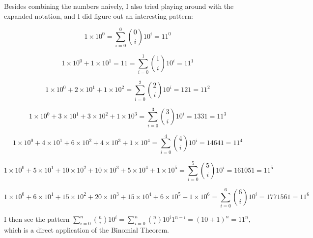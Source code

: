 \documentclass[10pt]{article}
\begin{document}
\begin{enumerate}
Besides combining the numbers naively, I also tried playing around with the expanded notation, and I did figure out an interesting pattern:

$$1 \times  10^0 = \sum\limits_{i=0}^{0}\binom{0}{i}10^i= 11^0$$

$$1 \times  10^0 + 1 \times 10^1 = 11 = \sum\limits_{i=0}^{1}\binom{1}{i}10^i = 11^1$$

$$1 \times  10^0 + 2 \times 10^1 + 1 \times 10^2 = \sum\limits_{i=0}^{2}\binom{2}{i}10^i = 121 = 11^2$$

$$1 \times  10^0 + 3 \times 10^1 + 3 \times 10^2 + 1 \times 10^3 = \sum\limits_{i=0}^{3}\binom{3}{i}10^i = 1331 = 11^3$$

$$1 \times  10^0 + 4 \times 10^1 + 6 \times 10^2 + 4 \times 10^3 + 1 \times 10^4= \sum\limits_{i=0}^{4}\binom{4}{i}10^i = 14641 = 11^4$$

$$1 \times  10^0 + 5 \times 10^1 + 10 \times 10^2 + 10 \times 10^3 + 5 \times 10^4 + 1 \times 10^5= \sum\limits_{i=0}^{5}\binom{5}{i}10^i = 161051 = 11^5$$

$$1 \times  10^0 + 6 \times 10^1 + 15 \times 10^2 + 20 \times 10^3 + 15 \times 10^4 + 6 \times 10^5 + 1 \times 10^6= \sum\limits_{i=0}^{6}\binom{6}{i}10^i =  1771561 = 11^6$$

I then see the pattern $\sum\limits_{i=0}^{n}\binom{n}{i}10^i = \sum\limits_{i=0}^{n}\binom{n}{i}10^i1^{n-i} = (10 + 1)^n = 11^n$, which is a direct application of the Binomial Theorem.

\end{enumerate}
\end{document}
